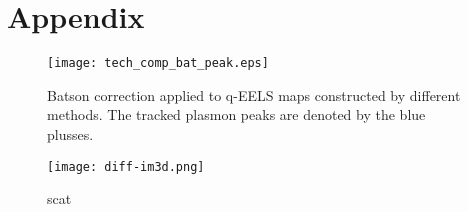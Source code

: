 \section*{Appendix}

\begin{figure}
    \centering
    \texttt{[image: tech\_comp\_bat\_peak.eps]}\caption{Batson correction applied to q-EELS maps constructed by different methods. The tracked plasmon peaks are denoted by the blue plusses.}
    \label{fig:bat-cor-comp}
\end{figure}
%
\begin{figure}
	\centering
	\texttt{[image: diff-im3d.png]}
	\caption{scat}
	\label{fig:diff-im3d}
\end{figure}
